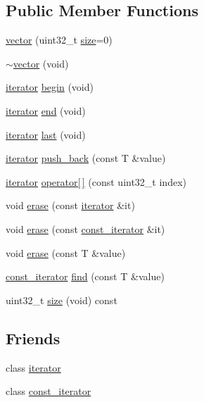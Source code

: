 \subsection*{Public Member Functions}
\begin{DoxyCompactItemize}
\item 
\hyperlink{classcrap_1_1vector_a61ab5234ed585b66741b16c7a39a468d}{vector} (uint32\+\_\+t \hyperlink{classcrap_1_1vector_ad563c5e3815c8072c3c4a13cd7f6d900}{size}=0)
\item 
\hyperlink{classcrap_1_1vector_a97195165b119d92d991dd249ff9d6ede}{$\sim$vector} (void)
\item 
\hyperlink{classcrap_1_1vector_1_1iterator}{iterator} \hyperlink{classcrap_1_1vector_a0cacd80285f1d3b409deae778f01dbd7}{begin} (void)
\item 
\hyperlink{classcrap_1_1vector_1_1iterator}{iterator} \hyperlink{classcrap_1_1vector_a592398b74783cc4838e700f3ce10de5d}{end} (void)
\item 
\hyperlink{classcrap_1_1vector_1_1iterator}{iterator} \hyperlink{classcrap_1_1vector_a22948a2090c5463c2dd78d3d7c91877f}{last} (void)
\item 
\hyperlink{classcrap_1_1vector_1_1iterator}{iterator} \hyperlink{classcrap_1_1vector_acd835a824c13a737b0ebeb42a26b4f97}{push\+\_\+back} (const T \&value)
\item 
\hyperlink{classcrap_1_1vector_1_1iterator}{iterator} \hyperlink{classcrap_1_1vector_abfa00af0d24f5cc24f4585d822992ef4}{operator\mbox{[}$\,$\mbox{]}} (const uint32\+\_\+t index)
\item 
void \hyperlink{classcrap_1_1vector_a4475e66c612c863460926f3531f5a1b1}{erase} (const \hyperlink{classcrap_1_1vector_1_1iterator}{iterator} \&it)
\item 
void \hyperlink{classcrap_1_1vector_adf2b7e209d4178b671135aee1f4549c1}{erase} (const \hyperlink{classcrap_1_1vector_1_1const__iterator}{const\+\_\+iterator} \&it)
\item 
void \hyperlink{classcrap_1_1vector_a4654c186148081562eb459ce2ff724bc}{erase} (const T \&value)
\item 
\hyperlink{classcrap_1_1vector_1_1const__iterator}{const\+\_\+iterator} \hyperlink{classcrap_1_1vector_a12441ccc04b0b458c36c00bad2961c04}{find} (const T \&value)
\item 
uint32\+\_\+t \hyperlink{classcrap_1_1vector_ad563c5e3815c8072c3c4a13cd7f6d900}{size} (void) const 
\end{DoxyCompactItemize}
\subsection*{Friends}
\begin{DoxyCompactItemize}
\item 
class \hyperlink{classcrap_1_1vector_a67171474c4da6cc8efe0c7fafefd2b2d}{iterator}
\item 
class \hyperlink{classcrap_1_1vector_ac220ce1c155db1ac44146c12d178056f}{const\+\_\+iterator}
\end{DoxyCompactItemize}


